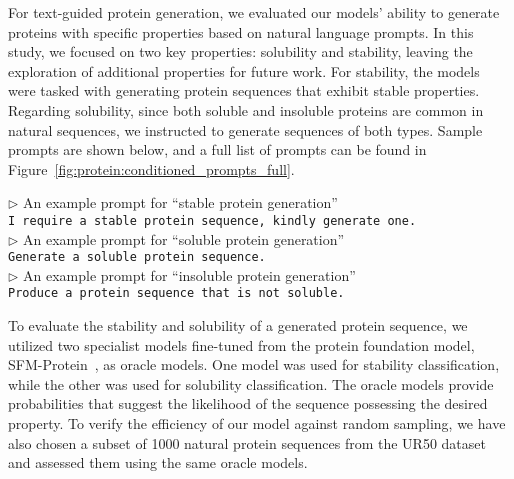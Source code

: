 For text-guided protein generation, we evaluated our models' ability to generate proteins with specific properties based on natural language prompts. In this study, we focused on two key properties: solubility and stability, leaving the exploration of additional properties for future work.
%
For stability, the models were tasked with generating protein sequences that exhibit stable properties. Regarding solubility, since both soluble and insoluble proteins are common in natural sequences, we instructed \ourM{} to generate sequences of both types. 
Sample prompts are shown below, and a full list of prompts can be found in Figure~\ref{fig:protein:conditioned_prompts_full}.

\begin{example} 
$\rhd$ An example prompt for ``stable protein generation''\\
\texttt{I require a stable protein sequence, kindly generate one.}\\
$\rhd$ An example prompt for ``soluble protein generation''\\
\texttt{Generate a soluble protein sequence.}\\
$\rhd$ An example prompt for ``insoluble protein generation''\\
\texttt{Produce a protein sequence that is not soluble.}
\end{example} 

To evaluate the stability and solubility of a generated protein sequence, we utilized two specialist models fine-tuned from the protein foundation model, SFM-Protein~\cite{he2024sfm}, as oracle models. One model was used for stability classification, while the other was used for solubility classification. %
The oracle models provide probabilities that suggest the likelihood of the sequence possessing the desired property. To verify the efficiency of our model against random sampling, we have also chosen a subset of 1000 natural protein sequences from the UR50 dataset and assessed them using the same oracle models.


